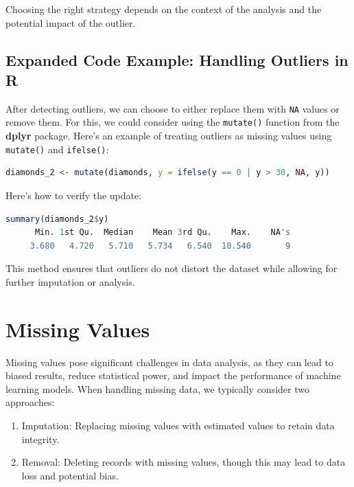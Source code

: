 \documentclass[
  11pt,
]{book}
\newcommand{\passthrough}[1]{#1}
\providecommand{\tightlist}{%
  \setlength{\itemsep}{0pt}\setlength{\parskip}{0pt}}
\theoremstyle{definition}
\theoremstyle{definition}
\theoremstyle{definition}
\theoremstyle{definition}
\theoremstyle{remark}
\begin{document}
Choosing the right strategy depends on the context of the analysis and the potential impact of the outlier.

\subsection*{Expanded Code Example: Handling Outliers in R}\label{expanded-code-example-handling-outliers-in-r}


After detecting outliers, we can choose to either replace them with \passthrough{\lstinline!NA!} values or remove them. For this, we could consider using the \passthrough{\lstinline!mutate()!} function from the \textbf{dplyr} package. Here's an example of treating outliers as missing values using \passthrough{\lstinline!mutate()!} and \passthrough{\lstinline!ifelse()!}:

\begin{lstlisting}[language=R]
diamonds_2 <- mutate(diamonds, y = ifelse(y == 0 | y > 30, NA, y))
\end{lstlisting}

Here's how to verify the update:

\begin{lstlisting}[language=R]
summary(diamonds_2$y)
      Min. 1st Qu.  Median    Mean 3rd Qu.    Max.    NA's 
     3.680   4.720   5.710   5.734   6.540  10.540       9
\end{lstlisting}

This method ensures that outliers do not distort the dataset while allowing for further imputation or analysis.

\section{Missing Values}\label{missing-values}

Missing values pose significant challenges in data analysis, as they can lead to biased results, reduce statistical power, and impact the performance of machine learning models. When handling missing data, we typically consider two approaches:

\begin{enumerate}
\def\labelenumi{\arabic{enumi}.}
\tightlist
\item
  Imputation: Replacing missing values with estimated values to retain data integrity.\\
\item
  Removal: Deleting records with missing values, though this may lead to data loss and potential bias.
\end{enumerate}
\end{document}
